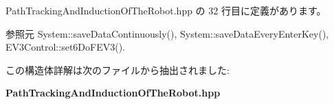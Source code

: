  Path\-Tracking\-And\-Induction\-Of\-The\-Robot.\-hpp の 32 行目に定義があります。



参照元 System\-::save\-Data\-Continuously(), System\-::save\-Data\-Every\-Enter\-Key(), E\-V3\-Control\-::set6\-Do\-F\-E\-V3().



この構造体詳解は次のファイルから抽出されました\-:\begin{DoxyCompactItemize}
\item 
{\bf Path\-Tracking\-And\-Induction\-Of\-The\-Robot.\-hpp}\end{DoxyCompactItemize}

